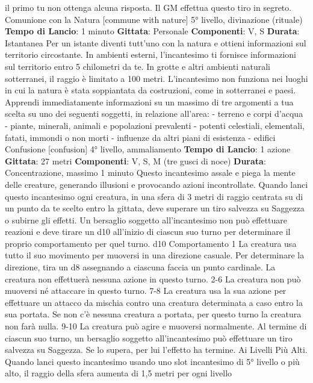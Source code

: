 \begin{multicols}{2}
il primo tu non ottenga alcuna risposta. Il GM effettua
questo tiro in segreto.
Comunione con la Natura
[commune with nature]
5° livello, divinazione (rituale)
\textbf{Tempo di Lancio}: 1 minuto
\textbf{Gittata}: Personale
\textbf{Componenti}: V, S
\textbf{Durata}: Istantanea
Per un istante diventi tutt’uno con la natura e ottieni
informazioni sul territorio circostante. In ambienti
esterni, l’incantesimo ti fornisce informazioni sul
territorio entro 5 chilometri da te. In grotte e altri 
ambienti naturali sotterranei, il raggio è limitato a 100
metri. L’incantesimo non funziona nei luoghi in cui la
natura è stata soppiantata da costruzioni, come in
sotterranei e paesi.
Apprendi immediatamente informazioni su un massimo
di tre argomenti a tua scelta su uno dei seguenti
soggetti, in relazione all’area:
- terreno e corpi d’acqua
- piante, minerali, animali e popolazioni prevalenti
- potenti celestiali, elementali, fatati, immondi o non
morti
- influenze da altri piani di esistenza
- edifici
Confusione
[confusion]
4° livello, ammaliamento
\textbf{Tempo di Lancio}: 1 azione
\textbf{Gittata}: 27 metri
\textbf{Componenti}: V, S, M (tre gusci di noce)
\textbf{Durata}: Concentrazione, massimo 1 minuto
Questo incantesimo assale e piega la mente delle
creature, generando illusioni e provocando azioni
incontrollate. Quando lanci questo incantesimo ogni
creatura, in una sfera di 3 metri di raggio centrata su di
un punto da te scelto entro la gittata, deve superare un
tiro salvezza su Saggezza o subirne gli effetti.
Un bersaglio soggetto all’incantesimo non può
effettuare reazioni e deve tirare un d10 all’inizio di
ciascun suo turno per determinare il proprio
comportamento per quel turno.
d10 Comportamento
1 La creatura usa tutto il suo movimento per muoversi in una
direzione casuale. Per determinare la direzione, tira un d8
assegnando a ciascuna faccia un punto cardinale. La
creatura non effettuerà nessuna azione in questo turno.
2-6 La creatura non può muoversi né attaccare in questo turno.
7-8 La creatura usa la sua azione per effettuare un attacco da
mischia contro una creatura determinata a caso entro la sua
portata. Se non c’è nessuna creatura a portata, per questo
turno la creatura non farà nulla.
9-10 La creatura può agire e muoversi normalmente.
Al termine di ciascun suo turno, un bersaglio soggetto
all’incantesimo può effettuare un tiro salvezza su
Saggezza. Se lo supera, per lui l’effetto ha termine.
Ai Livelli Più Alti. Quando lanci questo incantesimo
usando uno slot incantesimo di 5° livello o più alto, il
raggio della sfera aumenta di 1,5 metri per ogni livello

\end{multicols}

